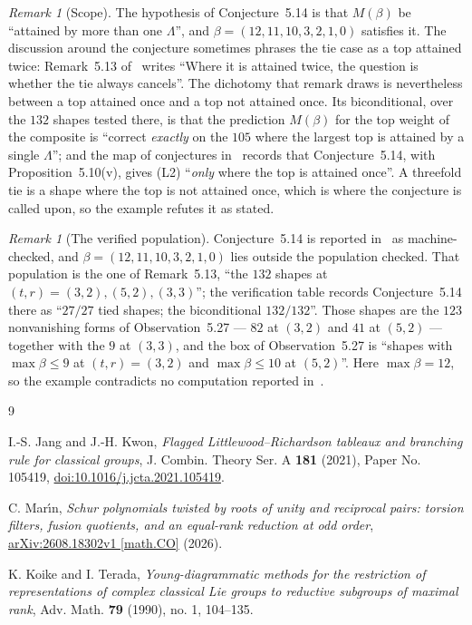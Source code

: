 \documentclass[11pt]{amsart}
\theoremstyle{remark}
\newtheorem{remark}[theorem]{Remark}
\begin{document}
\begin{remark}[Scope]
The hypothesis of Conjecture~5.14 is that $M(\beta)$ be ``attained by more
than one $\Lambda$'', and $\beta=(12,11,10,3,2,1,0)$ satisfies it. The
discussion around the conjecture sometimes phrases the tie case as a top
attained twice: Remark~5.13 of~\cite{Marin} writes ``Where it is attained
twice, the question is whether the tie always cancels''. The dichotomy that
remark draws is nevertheless between a top attained once and a top not
attained once. Its biconditional, over the $132$ shapes tested there, is
that the prediction $M(\beta)$ for the top weight of the composite is
``correct \emph{exactly} on the $105$ where the largest top is attained by
a single $\Lambda$''; and the map of conjectures in~\cite{Marin} records
that Conjecture~5.14, with Proposition~5.10(v), gives (L2) ``\emph{only}
where the top is attained once''. A threefold tie is a shape where the top
is not attained once, which is where the conjecture is called upon, so the
example refutes it as stated.
\end{remark}

\begin{remark}[The verified population]
Conjecture~5.14 is reported in~\cite{Marin} as machine-checked, and
$\beta=(12,11,10,3,2,1,0)$ lies outside the population checked. That
population is the one of Remark~5.13, ``the $132$ shapes at
$(t,r)=(3,2),(5,2),(3,3)$''; the verification table records
Conjecture~5.14 there as ``$27/27$ tied shapes; the biconditional
$132/132$''. Those shapes are the $123$
nonvanishing forms of Observation~5.27 --- $82$ at $(3,2)$ and $41$ at
$(5,2)$ --- together with the $9$ at $(3,3)$, and the box of
Observation~5.27 is ``shapes with $\max\beta\le9$ at $(t,r)=(3,2)$ and
$\max\beta\le10$ at $(5,2)$''. Here $\max\beta=12$, so the example
contradicts no computation reported in~\cite{Marin}.
\end{remark}

\begin{thebibliography}{9}

I.-S. Jang and J.-H. Kwon,
\emph{Flagged Littlewood--Richardson tableaux and branching rule for
classical groups},
J. Combin. Theory Ser. A \textbf{181} (2021),
Paper No. 105419,
\href{https://doi.org/10.1016/j.jcta.2021.105419}
{doi:10.1016/j.jcta.2021.105419}.

C. Mar\'\i n,
\emph{Schur polynomials twisted by roots of unity and reciprocal pairs:
torsion filters, fusion quotients, and an equal-rank reduction at odd
order},
\href{https://arxiv.org/abs/2608.18302v1}
{arXiv:2608.18302v1 [math.CO]} (2026).

K. Koike and I. Terada,
\emph{Young-diagrammatic methods for the restriction of representations of
complex classical Lie groups to reductive subgroups of maximal rank},
Adv. Math. \textbf{79} (1990), no. 1, 104--135.

\end{thebibliography}
\end{document}
